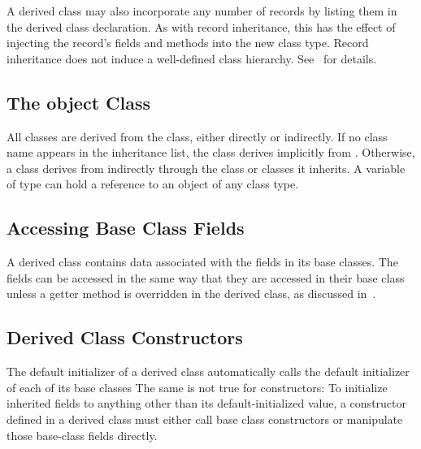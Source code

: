 \begin{future}
A derived class may also incorporate any number of records by listing them
in the derived class declaration.
As with record inheritance, this has the effect of injecting the record's fields and
methods into the new class type.  Record inheritance does not induce a
well-defined class hierarchy.  See~ for details.
\end{future}

\subsection{The object Class}
\label{The_object_Class}

All classes are derived from the  class, either directly or
indirectly.  If no class name appears in the inheritance list, the class derives
implicitly from .  Otherwise, a class derives from 
indirectly through the class or classes it inherits.  A variable of type 
can hold a reference to an object of any class type. 

\subsection{Accessing Base Class Fields}
\label{Accessing_Base_Class_Fields}

A derived class contains data associated with the fields in its base
classes.  The fields can be accessed in the same way that they are
accessed in their base class unless a getter method is
overridden in the derived class, as discussed
in~.

\subsection{Derived Class Constructors}
\label{Derived_Class_Constructors}

The default initializer of a derived class automatically calls the default
initializer of each of its base classes %
The same is not true for constructors:
To initialize inherited fields to anything other than its default-initialized
value, a constructor defined in a derived class must either call base class
constructors or manipulate those base-class fields directly.

